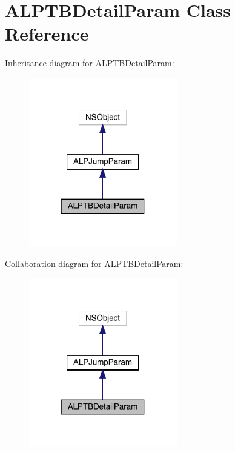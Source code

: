 \hypertarget{interface_a_l_p_t_b_detail_param}{}\section{A\+L\+P\+T\+B\+Detail\+Param Class Reference}
\label{interface_a_l_p_t_b_detail_param}


Inheritance diagram for A\+L\+P\+T\+B\+Detail\+Param\+:\nopagebreak
\begin{figure}[H]
\begin{center}
\leavevmode
\includegraphics[width=183pt]{interface_a_l_p_t_b_detail_param__inherit__graph}
\end{center}
\end{figure}


Collaboration diagram for A\+L\+P\+T\+B\+Detail\+Param\+:\nopagebreak
\begin{figure}[H]
\begin{center}
\leavevmode
\includegraphics[width=183pt]{interface_a_l_p_t_b_detail_param__coll__graph}
\end{center}
\end{figure}
